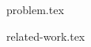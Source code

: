 \documentclass[a4paper,11pt,twoside]{report}
\begin{document}





{problem.tex}





{related-work.tex}




\end{document}
